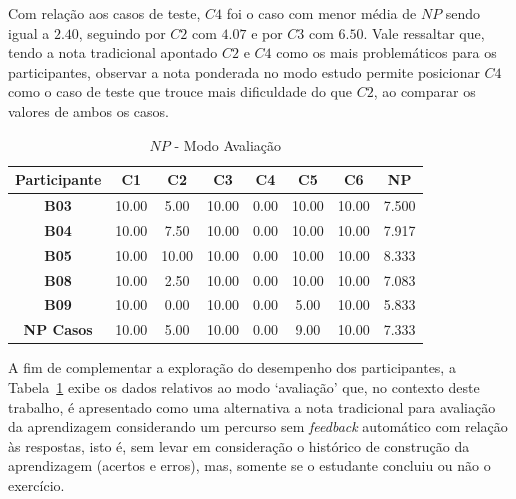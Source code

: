 Com relação aos casos de teste, $C4$ foi o caso com menor média de $NP$ sendo igual a $2.40$, seguindo por $C2$ com $4.07$ e por $C3$ com $6.50$. %
Vale ressaltar que, tendo a nota tradicional apontado $C2$ e $C4$ como os mais problemáticos para os participantes, observar a nota ponderada no modo estudo permite posicionar $C4$ como o caso de teste que trouce mais dificuldade do que $C2$, ao comparar os valores de ambos os casos.

\begin{table}[htbp]
	\centering
	\caption{$NP$ - Modo Avaliação}
	\begin{tabular}{|c|c|c|c|c|c|c|c|}
		\hline
		\rowcolor[HTML]{D9D9D9} 
		\textbf{Participante} & \textbf{C1} & \textbf{C2} & \textbf{C3} & \textbf{C4} & \textbf{C5} & \textbf{C6} & \textbf{NP} \\ \hline
		\rowcolor[HTML]{FFFFFF} 
		\textbf{B03} & 10.00 & 5.00 & 10.00 & 0.00 & 10.00 & 10.00 & 7.500 \\ \hline
		\rowcolor[HTML]{E7E6E6} 
		\textbf{B04} & 10.00 & 7.50 & 10.00 & 0.00 & 10.00 & 10.00 & 7.917 \\ \hline
		\rowcolor[HTML]{FFFFFF} 
		\textbf{B05} & 10.00 & 10.00 & 10.00 & 0.00 & 10.00 & 10.00 & 8.333 \\ \hline
		\rowcolor[HTML]{E7E6E6} 
		\textbf{B08} & 10.00 & 2.50 & 10.00 & 0.00 & 10.00 & 10.00 & 7.083 \\ \hline
		\rowcolor[HTML]{FFFFFF} 
		\textbf{B09} & 10.00 & 0.00 & 10.00 & 0.00 & 5.00 & 10.00 & 5.833 \\ \hline
		\rowcolor[HTML]{D9D9D9} 
		\textbf{NP Casos} & 10.00 & 5.00 & 10.00 & 0.00 & 9.00 & 10.00 & 7.333 \\ \hline
	\end{tabular}
	\label{tab:F3_A4_NP_AVALIACAO}
\end{table}

A fim de complementar a exploração do desempenho dos participantes, a Tabela~\ref{tab:F3_A4_NP_AVALIACAO} exibe os dados relativos ao modo `avaliação' que, no contexto deste trabalho, é apresentado como uma alternativa a nota tradicional para avaliação da aprendizagem considerando um percurso sem \textit{feedback} automático com relação às respostas, isto é, sem levar em consideração o histórico de construção da aprendizagem (acertos e erros), mas, somente se o estudante concluiu ou não o exercício.

